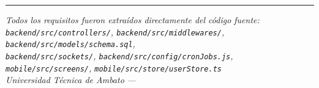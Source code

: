 \documentclass[12pt,a4paper]{article}
\begin{document}
\vspace{1.2cm}
\noindent\textcolor{primary}{\rule{\linewidth}{0.8pt}}
\begin{center}
\small\textit{Todos los requisitos fueron extraídos directamente del código fuente:\\
\texttt{backend/src/controllers/}, \texttt{backend/src/middlewares/}, \texttt{backend/src/models/schema.sql},\\
\texttt{backend/src/sockets/}, \texttt{backend/src/config/cronJobs.js},\\
\texttt{mobile/src/screens/}, \texttt{mobile/src/store/userStore.ts}\\[4pt]
Universidad Técnica de Ambato — \the\year}
\end{center}
\end{document}
